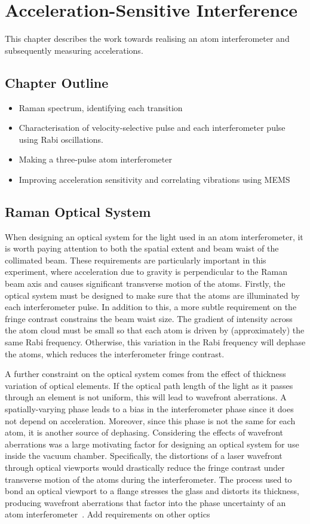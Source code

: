 \chapter{Acceleration-Sensitive Interference}\label{chap:atom_int}
This chapter describes the work towards realising an atom interferometer and subsequently measuring accelerations.
\section{Chapter Outline}
\begin{itemize}
    \item Raman spectrum, identifying each transition
    \item Characterisation of velocity-selective pulse and each interferometer pulse using Rabi oscillations.
    \item Making a three-pulse atom interferometer
    \item Improving acceleration sensitivity and correlating vibrations using MEMS
\end{itemize}
\section{Raman Optical System}\label{sec:setup_ramanoptics}

When designing an optical system for the light used in an atom interferometer, it is worth paying attention to both the spatial extent and beam waist of the collimated beam. These requirements are particularly important in this experiment, where acceleration due to gravity is perpendicular to the Raman beam axis and causes significant transverse motion of the atoms. Firstly, the optical system must be designed to make sure that the atoms are illuminated by each interferometer pulse. In addition to this, a more subtle requirement on the fringe contrast constrains the beam waist size. The gradient of intensity across the atom cloud must be small so that each atom is driven by (approximately) the same Rabi frequency. Otherwise, this variation in the Rabi frequency will dephase the atoms, which reduces the interferometer fringe contrast. 
\par\noindent 
A further constraint on the optical system comes from the effect of thickness variation of optical elements. If the optical path length of the light as it passes through an element is not uniform, this will lead to wavefront aberrations. A spatially-varying phase leads to a bias in the interferometer phase since it does not depend on acceleration. Moreover, since this phase is not the same for each atom, it is another source of dephasing. Considering the effects of wavefront aberrations was a large motivating factor for designing an optical system for use inside the vacuum chamber. Specifically, the distortions of a laser wavefront through optical viewports would drastically reduce the fringe contrast under transverse motion of the atoms during the interferometer. The process used to bond an optical viewport to a flange stresses the glass and distorts its thickness, producing wavefront aberrations that factor into the phase uncertainty of an atom interferometer~\cite{Schkolnik2015}.
{\huge Add requirements on other optics}

